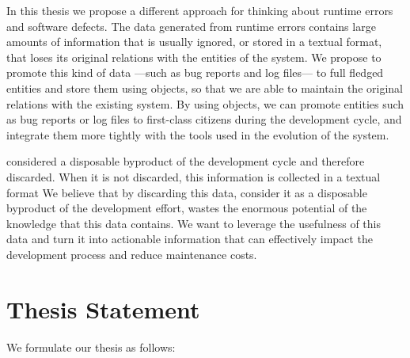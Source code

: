 
In this thesis we propose a different approach for thinking about runtime errors and software defects.
The data generated from runtime errors contains large amounts of information that is usually ignored, or stored in a textual format, that loses its original relations with the entities of the system.
We propose to promote this kind of data ---such as bug reports and log files--- to full fledged entities and store them using objects, so that we are able to maintain the original relations with the existing system.
By using objects, we can promote entities such as bug reports or log files to first-class citizens during the development cycle, and integrate them more tightly with the tools used in the evolution of the system.

considered a disposable byproduct of the development cycle and therefore discarded.
When it is not discarded, this information is collected in a textual format
We believe that by discarding this data, consider it as a disposable byproduct of the development effort, wastes the enormous potential of the knowledge that this data contains.
We want to leverage the usefulness of this data and turn it into actionable information that can effectively impact the development process and reduce maintenance costs.



\section{Thesis Statement}\label{sec:thesis}

We formulate our thesis as follows:


